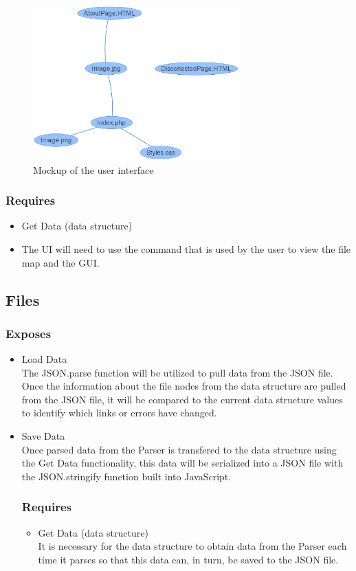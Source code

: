 \documentclass[letterpaper,10pt,titlepage,draftclsnofoot,onecolumn,onesided] {IEEEtran}
\begin{document}
\begin{itemize}
		\begin{figure}
                 \includegraphics[width=300px]{UIMockupEPS.eps}
                 \caption{Mockup of the user interface}
      \end{figure}
		
		\subsubsection{Requires}
		\begin{itemize}
			\item Get Data (data structure)
			\item The UI will need to use the command that is used by the user to view the file map and the GUI.
		\end{itemize}
		
	\subsection{Files}
		\subsubsection{Exposes}
		\begin{itemize}
			\item Load Data
			\\
			The JSON.parse function will be utilized to pull data from the JSON file. 
			Once the information about the file nodes from the data structure are pulled from the JSON file, it will be compared to the current data structure values to identify which links or errors have changed. \cite{stringify}
			\item Save Data
			\\
			Once parsed data from the Parser is transfered to the data structure using the Get Data functionality, this data will be serialized into a JSON file with the JSON.stringify function built into JavaScript.
		\subsubsection{Requires}
		\begin{itemize}
			\item Get Data (data structure)
			\\
			It is necessary for the data structure to obtain data from the Parser each time it parses so that this data can, in turn, be saved to the JSON file.



\end{itemize}
\end{itemize}
\end{itemize}
\end{document}
